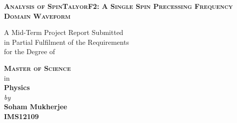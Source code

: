 \documentclass[12pt, a4wide]{report}
\theoremstyle{plain}
\theoremstyle{definition}
\theoremstyle{remark}
\begin{document}


\begin{titlepage}
\enlargethispage{10mm}
\begin{center}
\vspace*{-10mm}

\textbf{\textsc{\Large Analysis of SpinTalyorF2: A Single Spin Precessing Frequency Domain Waveform }}\\

\vspace*{10mm}

A Mid-Term Project Report Submitted \\
in Partial Fulfilment of the Requirements  \\
for the Degree of  \\

\vspace{5mm}

\textbf{\textsc{\Large Master of Science}}\\
in \\
{\large \bf Physics} \\
\vspace{7mm}
{\textit{by}} \\ \vspace{2mm}
{\textbf{\large Soham Mukherjee}}\\
{\textbf{IMS12109}}\\

\vspace*{5.5mm}


\end{center}
\end{titlepage}
\end{document}

